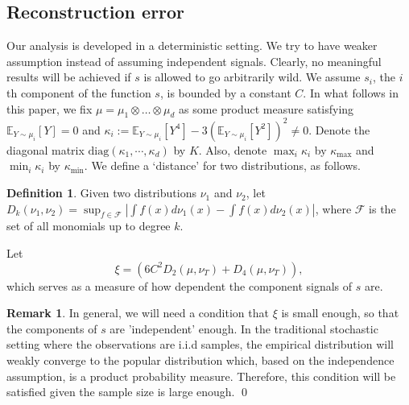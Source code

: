 \documentclass[twoside]{article}
\newcommand{\E}{\mathbb{E}}
\theoremstyle{definition}
\newtheorem{definition}[lemma]{Definition}
\newtheorem{remark}[lemma]{Remark}
\begin{document}
\subsection{Reconstruction error}
\label{subsec:errorHK}
Our analysis is developed in a deterministic setting.
We try to have weaker assumption instead of assuming independent signals. 
Clearly, no meaningful results will be achieved if $s$ is allowed to go arbitrarily wild. 
We assume $s_i$, the $i$th component of the function $s$, is bounded by a constant $C$. 
In what follows in this paper, we fix $\mu = \mu_1\otimes \ldots \otimes \mu_d$ as some product measure
satisfying $\E_{Y\sim\mu_i}[Y]=0$ and $\kappa_i := \E_{Y\sim \mu_i}[Y^4] - 3\left(\E_{Y\sim \mu_i}[Y^2]\right)^2\neq 0$.
Denote the diagonal matrix $\text{diag}(\kappa_1,\cdots,\kappa_d)$ by $K$. 
Also, denote $\max_{i} \kappa_i$ by $\kappa_{\max}$ and $\min_{i} \kappa_i$ by $\kappa_{\min}$.
We define a `distance' for two distributions, as follows. 
\begin{definition}
Given two distributions $\nu_1$ and $\nu_2$, let $D_k(\nu_1,\nu_2) = \sup_{f\in\mathcal{F}} |\int f(x)d\nu_1(x) - \int f(x)d\nu_2(x)|$, where $\mathcal{F}$ is the set of all monomials up to degree $k$.
\end{definition} 
Let 
\begin{equation}
\xi = \left( 6C^2D_2(\mu, \nu_T) + D_4(\mu, \nu_T)\right),
\end{equation}
which serves as a measure of how dependent the  component signals of $s$ are.

\begin{remark}
\label{rmk:xi}
In general, we will need a condition that $\xi$ is small enough, so that the components of $s$ are 'independent' enough.
In the traditional stochastic setting where the observations are i.i.d samples, the empirical distribution will weakly converge to the popular distribution which, based on the independence assumption, is a product probability measure. 
Therefore, this condition will be satisfied given the sample size is large enough. \qed
\end{remark} 
\end{document}

